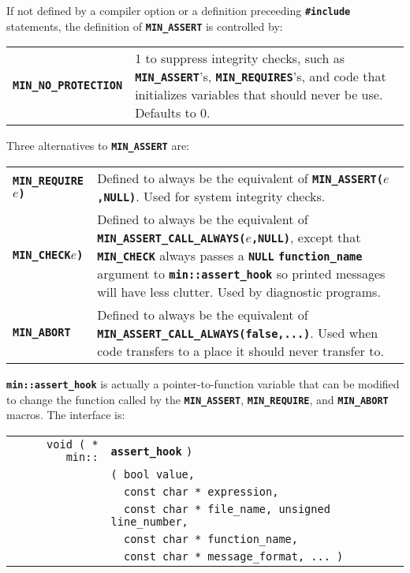 \documentclass[12pt]{article}
\makeatletter
\newcommand{\TT}[1]{{\tt \bfseries #1}}
\newcommand{\ttkey}[1]{\TT{#1}\index{#1@{\tt #1}}}
\newcommand{\ttindex}[1]{\index{#1@{\tt #1}}}
\newcommand{\EOL}{\penalty \exhyphenpenalty}
\newenvironment{indpar}[1][0.3in]%
	{\begin{list}{}%
		     {\setlength{\itemsep}{0in}%
		      \setlength{\topsep}{0in}%
		      \setlength{\parsep}{1ex}%
		      \setlength{\labelwidth}{#1}%
		      \setlength{\leftmargin}{#1}%
		      \addtolength{\leftmargin}{\labelsep}}%
	 \item}%
	{\end{list}}
\newcommand{\LABEL}[1]{\label{#1}}
\newlength{\ARGBREAKLENGTH}
\newcommand{\ARGBREAK}[1][\ARGBREAKLENGTH]{\\&\hspace*{#1}}
\newcommand{\TTKEY}[1]{\ttkey{#1}}
\newcommand{\MINKEY}[1]%
	   {\TT{#1}\ttindex{min::#1}\ttindex{#1}}
\makeatother
\begin{document}
If not defined by a compiler option or a definition preceeding
\TT{\#include} statements, the definition of
\TT{MIN\_ASSERT} is controlled by:

\begin{indpar}[0.2in]\begin{tabular}{p{2.1in}p{3.5in}}
\TTKEY{MIN\_NO\_PROTECTION}	& 1 to suppress integrity checks,
                                  such as \TT{MIN\_\EOL ASSERT}'s,
                                  \TT{MIN\_\EOL REQUIRES}'s,
                                  and code that initializes
				  variables that should never
				  be use.  Defaults to 0.  
\LABEL{MIN_NO_PROTECTION}
\end{tabular}\end{indpar}

Three alternatives to \TT{MIN\_ASSERT} are:

\begin{indpar}\begin{tabular}{lp{4.5in}}
\TTKEY{MIN\_REQUIRE}\TT{(}$e$\TT{)}
	& Defined to always be the equivalent of
	  \TT{MIN\_\EOL ASSERT(}$e$\TT{,NULL)}.
	  Used for system integrity checks.
\LABEL{MIN_REQUIRE} \\
\TTKEY{MIN\_CHECK}\TT{(}$e$\TT{)}
	& Defined to always be the equivalent of
	  \TT{MIN\_\EOL ASSERT\_\EOL CALL\_\EOL ALWAYS(}$e$\TT{,NULL)},
	  except that \TT{MIN\_\EOL CHECK} always passes a \TT{NULL}
	  \TT{function\_\EOL name} argument to
	  \TT{min::\EOL assert\_\EOL hook} so printed messages will
	  have less clutter.  Used by diagnostic programs.
\LABEL{MIN_CHECK} \\
\TTKEY{MIN\_ABORT}\TT{(...)}
	& Defined to always be the equivalent of
	  \TT{MIN\_\EOL ASSERT\_\EOL CALL\_\EOL ALWAYS(false,...)}.
	  Used when code transfers to a place it
	  should never transfer to.
\LABEL{MIN_ABORT} \\
\end{tabular}\end{indpar}

\TT{min::assert\_hook} is actually a pointer-to-function variable
that can be modified to change the function called by 
the \TT{MIN\_\EOL ASSERT}, \TT{MIN\_\EOL REQUIRE}, and \TT{MIN\_\EOL ABORT}
macros.  The interface is:

\begin{indpar}\begin{tabular}{r@{}l}
\verb|void ( * min::| & \MINKEY{assert\_hook} \verb|)|\ARGBREAK
    \verb|( bool value,|\ARGBREAK
    \verb|  const char * expression,|\ARGBREAK
    \verb|  const char * file_name, unsigned line_number,|\ARGBREAK
    \verb|  const char * function_name,|\ARGBREAK
    \verb|  const char * message_format, ... )|
\LABEL{MIN::ASSERT_HOOK} \\
\end{tabular}\end{indpar}
\end{document}
